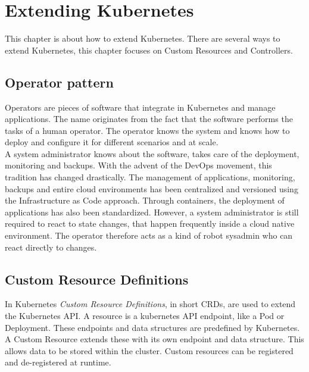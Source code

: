 \chapter{Extending Kubernetes}

This chapter is about how to extend Kubernetes.
There are several ways to extend Kubernetes, this chapter focuses on Custom Resources and Controllers.

\section{Operator pattern}\label{sec:operator-pattern}

Operators are pieces of software that integrate in Kubernetes and manage applications.
The name originates from the fact that the software performs the tasks of a human operator.
The operator knows the system and knows how to deploy and configure it for different scenarios and at scale.~\cite{KUBERNETES-OPERATOR}
\\
A system administrator knows about the software, takes care of the deployment, monitoring and backups.
With the advent of the DevOps movement, this tradition has changed drastically.
The management of applications, monitoring, backups and entire cloud environments has been centralized and versioned using the Infrastructure as Code approach.
Through containers, the deployment of applications has also been standardized.
However, a system administrator is still required to react to state changes, that happen frequently inside a cloud native environment.
The operator therefore acts as a kind of robot sysadmin who can react directly to changes.~\cite{RED-HAT-OPERATOR}

\section{Custom Resource Definitions}\label{sec:custom-resource-definitions}

In Kubernetes \textit{Custom Resource Definitions}, in short CRDs, are used to extend the Kubernetes API.
A resource is a kubernetes API endpoint, like a Pod or Deployment.
These endpoints and data structures are predefined by Kubernetes.
A Custom Resource extends these with its own endpoint and data structure.
This allows data to be stored within the cluster.
Custom resources can be registered and de-registered at runtime.~\cite{KUBERNETES-CRD}

